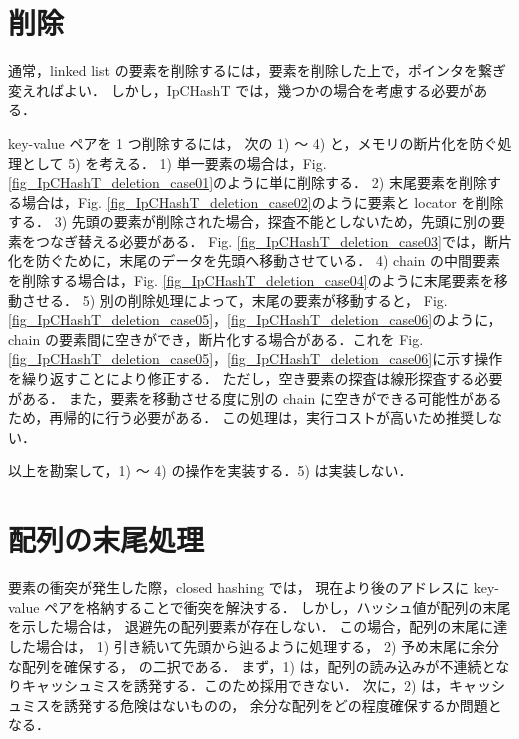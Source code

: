 \newpage
\section{削除}

通常，linked list の要素を削除するには，要素を削除した上で，ポインタを繋ぎ変えればよい．
しかし，IpCHashT では，幾つかの場合を考慮する必要がある．

key-value ペアを 1 つ削除するには，
次の 1) 〜 4) と，メモリの断片化を防ぐ処理として 5) を考える．
1) 単一要素の場合は，Fig. \ref{fig_IpCHashT_deletion_case01}のように単に削除する．
2) 末尾要素を削除する場合は，Fig. \ref{fig_IpCHashT_deletion_case02}のように要素と locator を削除する．
3) 先頭の要素が削除された場合，探査不能としないため，先頭に別の要素をつなぎ替える必要がある．
Fig. \ref{fig_IpCHashT_deletion_case03}では，断片化を防ぐために，末尾のデータを先頭へ移動させている．
4) chain の中間要素を削除する場合は，Fig. \ref{fig_IpCHashT_deletion_case04}のように末尾要素を移動させる．
5) 別の削除処理によって，末尾の要素が移動すると，
Fig. \ref{fig_IpCHashT_deletion_case05}，\ref{fig_IpCHashT_deletion_case06}のように，
chain の要素間に空きができ，断片化する場合がある．これを
Fig. \ref{fig_IpCHashT_deletion_case05}，\ref{fig_IpCHashT_deletion_case06}に示す操作を繰り返すことにより修正する．
ただし，空き要素の探査は線形探査する必要がある．
また，要素を移動させる度に別の chain に空きができる可能性があるため，再帰的に行う必要がある．
この処理は，実行コストが高いため推奨しない．

以上を勘案して，1) 〜 4) の操作を実装する．5) は実装しない．

\section{配列の末尾処理}

要素の衝突が発生した際，closed hashing では，
現在より後のアドレスに key-value ペアを格納することで衝突を解決する．
しかし，ハッシュ値が配列の末尾を示した場合は，
退避先の配列要素が存在しない．
この場合，配列の末尾に達した場合は，
1) 引き続いて先頭から辿るように処理する，
2) 予め末尾に余分な配列を確保する，
の二択である．
まず，1) は，配列の読み込みが不連続となりキャッシュミスを誘発する．このため採用できない．
次に，2) は，キャッシュミスを誘発する危険はないものの，
余分な配列をどの程度確保するか問題となる．

